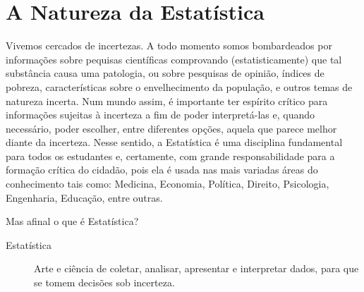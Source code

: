 
\def\chapterillustration{./abertura-estatistica1}%
\def\chapterwhat{Especificidade do pensamento estatístico a partir de problemas. Conceitos: população e amostra, parâmetro e estimador. Variáveis estatísticas e suas classificações. Organização dos dados em tabelas de frequências. Representações gráficas adequadas para os diferentes tipos de variáveis. Noções básicas de amostragem.}
\def\chapterbecause{A Estatística está presente no mundo contemporâneo e chega aos cidadãos em todos os
meios de comunicação. Diariamente somos confrontados com informações estatísticas
sobre temas como Economia, Educação, Esportes, Saúde, Meio-Ambiente, entre outros.
Tais informações orientam decisões em nossas vidas pessoais e permitem-nos exercer
nossas responsabilidades como cidadãos. Um conhecimento básico de Estatística é
fundamental na formação do cidadão para que este possa, de forma competente, apreciar
e criticar argumentos baseados em dados.} 
\chapter{A Natureza da Estatística}
\label{\detokenize{PE103:a-natureza-da-estatistica}}\label{\detokenize{PE103::doc}}


\label{\detokenize{PE103-0:explorando-compreendendo-a-natureza-da-estatistica}}\label{\detokenize{PE103-0::doc}}\label{\detokenize{PE103-0:cap-a-natureza-da-estatistica}}
Vivemos cercados de incertezas. A todo momento somos bombardeados por informações sobre pequisas científicas comprovando (estatisticamente) que tal substância causa uma patologia, ou sobre pesquisas de opinião, índices de pobreza, características sobre o envelhecimento da população, e outros temas de natureza incerta. Num mundo assim, é importante ter espírito crítico para informações sujeitas à incerteza a fim de poder interpretá-las e, quando necessário, poder escolher, entre diferentes opções, aquela que parece melhor diante da incerteza.  Nesse sentido, a Estatística é uma disciplina fundamental para todos os estudantes e, certamente, com grande responsabilidade para a formação crítica do cidadão, pois ela é usada nas mais variadas áreas do conhecimento tais como: Medicina, Economia, Política, Direito, Psicologia, Engenharia, Educação, entre outras.

Mas afinal o que é Estatística?
\begin{description}
\item[{Estatística}] \leavevmode{}\label{\detokenize{PE103-0:term-estatistica}}
Arte e ciência de coletar, analisar, apresentar e interpretar dados, para que se tomem decisões sob incerteza.
\end{description}

